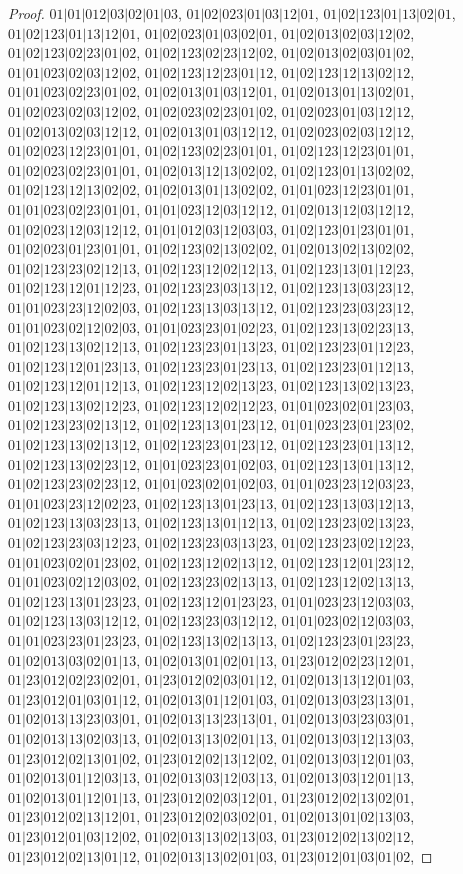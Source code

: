 \documentclass[12pt]{article}
\theoremstyle{plain}
\theoremstyle{definition}
\theoremstyle{remark}
\begin{document}
\begin{proof}
$01|01|012|03|02|01|03$, $01|02|023|01|03|12|01$, $01|02|123|01|13|02|01$, $01|02|123|01|13|12|01$, $01|02|023|01|03|02|01$, $01|02|013|02|03|12|02$, $01|02|123|02|23|01|02$, $01|02|123|02|23|12|02$, $01|02|013|02|03|01|02$, $01|01|023|02|03|12|02$, $01|02|123|12|23|01|12$, $01|02|123|12|13|02|12$, $01|01|023|02|23|01|02$, $01|02|013|01|03|12|01$, $01|02|013|01|13|02|01$, $01|02|023|02|03|12|02$, $01|02|023|02|23|01|02$, $01|02|023|01|03|12|12$, $01|02|013|02|03|12|12$, $01|02|013|01|03|12|12$, $01|02|023|02|03|12|12$, $01|02|023|12|23|01|01$, $01|02|123|02|23|01|01$, $01|02|123|12|23|01|01$, $01|02|023|02|23|01|01$, $01|02|013|12|13|02|02$, $01|02|123|01|13|02|02$, $01|02|123|12|13|02|02$, $01|02|013|01|13|02|02$, $01|01|023|12|23|01|01$, $01|01|023|02|23|01|01$, $01|01|023|12|03|12|12$, $01|02|013|12|03|12|12$, $01|02|023|12|03|12|12$, $01|01|012|03|12|03|03$, $01|02|123|01|23|01|01$, $01|02|023|01|23|01|01$, $01|02|123|02|13|02|02$, $01|02|013|02|13|02|02$, $01|02|123|23|02|12|13$, $01|02|123|12|02|12|13$, $01|02|123|13|01|12|23$, $01|02|123|12|01|12|23$, $01|02|123|23|03|13|12$, $01|02|123|13|03|23|12$, $01|01|023|23|12|02|03$, $01|02|123|13|03|13|12$, $01|02|123|23|03|23|12$, $01|01|023|02|12|02|03$, $01|01|023|23|01|02|23$, $01|02|123|13|02|23|13$, $01|02|123|13|02|12|13$, $01|02|123|23|01|13|23$, $01|02|123|23|01|12|23$, $01|02|123|12|01|23|13$, $01|02|123|23|01|23|13$, $01|02|123|23|01|12|13$, $01|02|123|12|01|12|13$, $01|02|123|12|02|13|23$, $01|02|123|13|02|13|23$, $01|02|123|13|02|12|23$, $01|02|123|12|02|12|23$, $01|01|023|02|01|23|03$, $01|02|123|23|02|13|12$, $01|02|123|13|01|23|12$, $01|01|023|23|01|23|02$, $01|02|123|13|02|13|12$, $01|02|123|23|01|23|12$, $01|02|123|23|01|13|12$, $01|02|123|13|02|23|12$, $01|01|023|23|01|02|03$, $01|02|123|13|01|13|12$, $01|02|123|23|02|23|12$, $01|01|023|02|01|02|03$, $01|01|023|23|12|03|23$, $01|01|023|23|12|02|23$, $01|02|123|13|01|23|13$, $01|02|123|13|03|12|13$, $01|02|123|13|03|23|13$, $01|02|123|13|01|12|13$, $01|02|123|23|02|13|23$, $01|02|123|23|03|12|23$, $01|02|123|23|03|13|23$, $01|02|123|23|02|12|23$, $01|01|023|02|01|23|02$, $01|02|123|12|02|13|12$, $01|02|123|12|01|23|12$, $01|01|023|02|12|03|02$, $01|02|123|23|02|13|13$, $01|02|123|12|02|13|13$, $01|02|123|13|01|23|23$, $01|02|123|12|01|23|23$, $01|01|023|23|12|03|03$, $01|02|123|13|03|12|12$, $01|02|123|23|03|12|12$, $01|01|023|02|12|03|03$, $01|01|023|23|01|23|23$, $01|02|123|13|02|13|13$, $01|02|123|23|01|23|23$, $01|02|013|03|02|01|13$, $01|02|013|01|02|01|13$, $01|23|012|02|23|12|01$, $01|23|012|02|23|02|01$, $01|23|012|02|03|01|12$, $01|02|013|13|12|01|03$, $01|23|012|01|03|01|12$, $01|02|013|01|12|01|03$, $01|02|013|03|23|13|01$, $01|02|013|13|23|03|01$, $01|02|013|13|23|13|01$, $01|02|013|03|23|03|01$, $01|02|013|13|02|03|13$, $01|02|013|13|02|01|13$, $01|02|013|03|12|13|03$, $01|23|012|02|13|01|02$, $01|23|012|02|13|12|02$, $01|02|013|03|12|01|03$, $01|02|013|01|12|03|13$, $01|02|013|03|12|03|13$, $01|02|013|03|12|01|13$, $01|02|013|01|12|01|13$, $01|23|012|02|03|12|01$, $01|23|012|02|13|02|01$, $01|23|012|02|13|12|01$, $01|23|012|02|03|02|01$, $01|02|013|01|02|13|03$, $01|23|012|01|03|12|02$, $01|02|013|13|02|13|03$, $01|23|012|02|13|02|12$, $01|23|012|02|13|01|12$, $01|02|013|13|02|01|03$, $01|23|012|01|03|01|02$, 
\end{proof}
\end{document}
